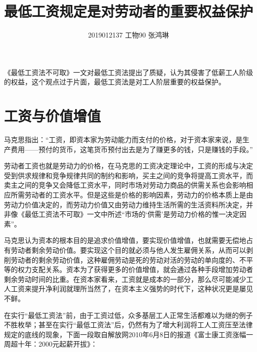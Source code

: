 \documentclass[UTF8]{ctexart}
\begin{document}
\title{最低工资规定是对劳动者的重要权益保护}
\author{2019012137  工物90  张鸿琳}
\maketitle

《最低工资法不可取》一文对最低工资法提出了质疑，认为其侵害了低薪工人阶级的权益，这个观点过于片面，最低工资法是对工人阶层重要的权益保护。

\section{工资与价值增值}
马克思指出：“工资，即资本家为劳动能力而支付的价格，对于资本家来说，是生产费用——预付的货币，这笔货币预付出去是为了赚更多的钱，只是赚钱的手段。” 

劳动者工资也就是劳动力的价格，在马克思的工资决定理论中，工资的形成与决定受到供求规律和竞争规律共同的制约和影响，买主之间的竞争将提高工资水平，而卖主之间的竞争又会降低工资水平，同时市场对劳动力商品的供需关系也会影响相应所需劳动者的工资水平。但是这些是价格的影响因素，劳动力的价格本质上是由劳动力价值决定的，而劳动力价值又由劳动力维持生活所需的生活资料所决定，并非像《最低工资法不可取》一文中所述“市场的‘供需’是劳动力价格的惟一决定因素”。

马克思认为资本的根本目的是追求价值增值，要实现价值增值，也就需要无偿地占有劳动者剩余劳动价值。要实现这个目的就必须与他人发生雇佣关系，从而可以剥削劳动者的剩余劳动价值，这种雇佣劳动是死的劳动对活的劳动的单向度的、不平等的权力支配关系。资本为了获得更多的价值增值，就会通过各种手段增加劳动者剩余劳动时间的比重。在资本家看来，工资就是成本的一部分，那么尽可能减少工人工资来提升净利润就理所当然了，在资本主义强势的时代下，这种状况更是屡见不鲜。

在实行“最低工资法”前，由于工资过低，众多基层工人正常生活都难以为继的例子不胜枚举；甚至在实行“最低工资法”后，仍然有为了增大利润将工人工资压至法律规定的底线的现象，下面一段取自解放网2010年6月8日的报道《富士康工资涨幅一周超十年：2000元起薪开拔》：

\begin{center}
\end{center}
\end{document}

